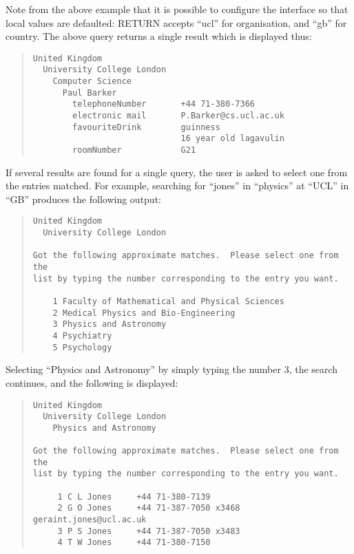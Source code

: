 Note from the above example that it is possible to configure the interface 
so that local values are defaulted: RETURN accepts ``ucl'' for organisation,
and ``gb'' for country.  The above query returns a single result which is
displayed thus:

\begin{quote}\footnotesize\begin{verbatim}
United Kingdom
  University College London
    Computer Science
      Paul Barker
        telephoneNumber       +44 71-380-7366
        electronic mail       P.Barker@cs.ucl.ac.uk
        favouriteDrink        guinness
                              16 year old lagavulin
        roomNumber            G21
\end{verbatim}\end{quote}

If several results are found for a single query, the user is asked to select
one from the entries matched.  For example, searching for ``jones'' in
``physics'' at ``UCL'' in ``GB'' produces the following output:

\begin{quote}\footnotesize\begin{verbatim}
United Kingdom
  University College London

Got the following approximate matches.  Please select one from the 
list by typing the number corresponding to the entry you want.

    1 Faculty of Mathematical and Physical Sciences
    2 Medical Physics and Bio-Engineering
    3 Physics and Astronomy
    4 Psychiatry
    5 Psychology
\end{verbatim}\end{quote}

Selecting ``Physics and Astronomy'' by simply typing the number 3, the
search continues, and the following is displayed:

\begin{quote}\footnotesize\begin{verbatim}
United Kingdom
  University College London
    Physics and Astronomy

Got the following approximate matches.  Please select one from the
list by typing the number corresponding to the entry you want.

     1 C L Jones     +44 71-380-7139
     2 G O Jones     +44 71-387-7050 x3468  geraint.jones@ucl.ac.uk
     3 P S Jones     +44 71-387-7050 x3483
     4 T W Jones     +44 71-380-7150
\end{verbatim}\end{quote}

